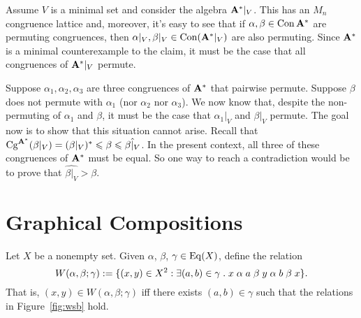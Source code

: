 Assume $V$ is a minimal set and consider the algebra $\mathbf{A}^*|_V$.  This has an $M_n$
congruence lattice and, moreover, it's easy to see that if $\alpha, \beta \in \operatorname{Con}\mathbf{A}^*$ are
permuting congruences, then $\alpha|_V, \beta|_V \in \operatorname{Con} (\mathbf{A}^*|_V)$ are also permuting.
Since $\mathbf{A}^*$ is a minimal counterexample to the claim, it must be the case that all congruences of 
$\mathbf{A}^*|_V$ permute.

Suppose $\alpha_1, \alpha_2, \alpha_3$ are three congruences of $\mathbf{A}^*$ that pairwise permute.
Suppose $\beta$ does not permute with $\alpha_1$ (nor $\alpha_2$ nor $\alpha_3$).
We now know that, despite the non-permuting of $\alpha_1$ and $\beta$, it must be the case that 
$\alpha_1|_V$ and $\beta|_V$ permute. The goal now is to show that this situation cannot arise.
Recall that $\operatorname{Cg}^{\mathbf{A}^*}(\beta|_V) = (\beta|_V)^* \leqslant \beta\leqslant \hat{\beta|_V}$.
In the present context, all three of these congruences of $\mathbf{A}^*$ must be equal.
So one way to reach a contradiction would be to prove that $\hat{\beta|_V} > \beta$.





\section{Graphical Compositions}
Let $X$ be a nonempty set. Given $\alpha$, $\beta$, $\gamma \in \operatorname{Eq}(X)$,
define the relation 
\[
W(\alpha, \beta; \gamma) := \{(x,y) \in X^2 : \exists (a, b) \in \gamma
\; . \; x \mathrel{\alpha} a \mathrel{\beta} y \mathrel{\alpha} b \mathrel{\beta} x\}.
\]
That is, $(x,y) \in W(\alpha, \beta; \gamma)$ iff there exists $(a,b)\in \gamma$
such that the relations in Figure~\ref{fig:wsb} hold.


